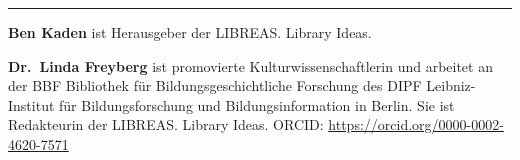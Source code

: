 \begin{center}\rule{0.5\linewidth}{0.5pt}\end{center}

\textbf{Ben Kaden} ist Herausgeber der LIBREAS. Library Ideas.

\textbf{Dr.~Linda Freyberg} ist promovierte Kulturwissenschaftlerin und
arbeitet an der BBF \textbar{} Bibliothek für Bildungsgeschichtliche
Forschung des DIPF \textbar{} Leibniz-Institut für Bildungsforschung und
Bildungsinformation in Berlin. Sie ist Redakteurin der LIBREAS. Library
Ideas. ORCID: \url{https://orcid.org/0000-0002-4620-7571}
